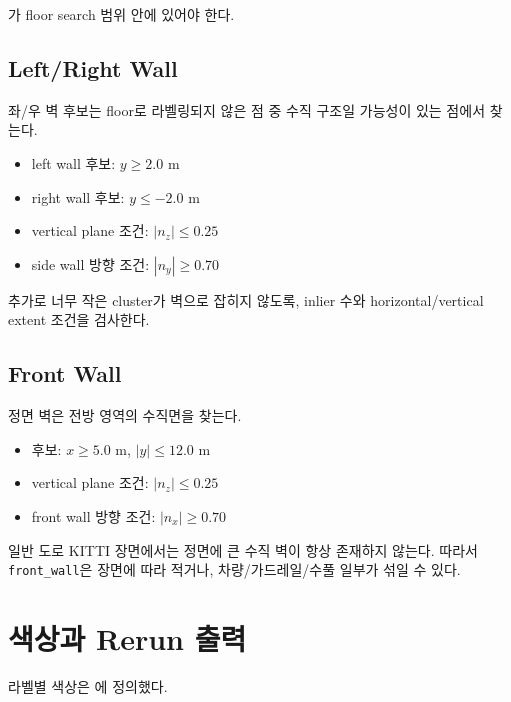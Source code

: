 \documentclass[11pt,a4paper,oneside]{report}
\begin{document}
가 floor search 범위 안에 있어야 한다.

\section{Left/Right Wall}

좌/우 벽 후보는 floor로 라벨링되지 않은 점 중 수직 구조일 가능성이 있는 점에서 찾는다.

\begin{itemize}[leftmargin=2em]
\item left wall 후보: $y \ge 2.0$ m
\item right wall 후보: $y \le -2.0$ m
\item vertical plane 조건: $|n_z| \le 0.25$
\item side wall 방향 조건: $|n_y| \ge 0.70$
\end{itemize}

추가로 너무 작은 cluster가 벽으로 잡히지 않도록, inlier 수와 horizontal/vertical extent 조건을 검사한다.

\section{Front Wall}

정면 벽은 전방 영역의 수직면을 찾는다.

\begin{itemize}[leftmargin=2em]
\item 후보: $x \ge 5.0$ m, $|y| \le 12.0$ m
\item vertical plane 조건: $|n_z| \le 0.25$
\item front wall 방향 조건: $|n_x| \ge 0.70$
\end{itemize}

\begin{warnbox}
일반 도로 KITTI 장면에서는 정면에 큰 수직 벽이 항상 존재하지 않는다. 따라서 \texttt{front\_wall}은 장면에 따라 적거나, 차량/가드레일/수풀 일부가 섞일 수 있다.
\end{warnbox}

\chapter{색상과 Rerun 출력}

라벨별 색상은 에 정의했다.
\end{document}
